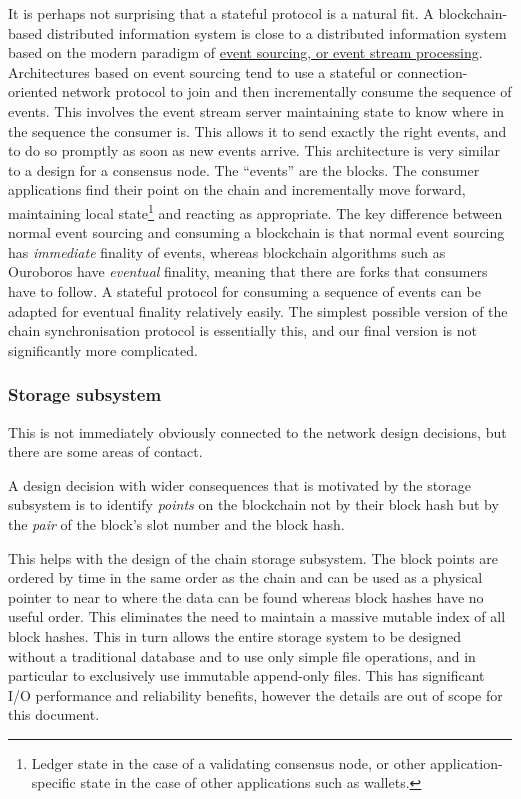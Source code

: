 \documentclass[11pt,a4paper]{article}
\begin{document}
It is perhaps not surprising that a stateful protocol is a natural fit.
A blockchain-based distributed information system is close to a
distributed information system based on the modern paradigm of
\href{https://en.wikipedia.org/wiki/Event-driven_architecture}{{event
sourcing, or event stream processing}}. Architectures based on event
sourcing tend to use a stateful or connection-oriented network protocol
to join and then incrementally consume the sequence of events. This
involves the event stream server maintaining state to know where in the
sequence the consumer is. This allows it to send exactly the right
events, and to do so promptly as soon as new events arrive. This
architecture is very similar to a design for a consensus node. The
``events'' are the blocks. The consumer applications find their point on
the chain and incrementally move forward, maintaining local
state\footnote{Ledger state in the case of a validating consensus node,
  or other application-specific state in the case of other applications
  such as wallets.} and reacting as appropriate. The key difference
between normal event sourcing and consuming a blockchain is that normal
event sourcing has \emph{immediate} finality of events, whereas
blockchain algorithms such as Ouroboros have \emph{eventual} finality,
meaning that there are forks that consumers have to follow. A stateful
protocol for consuming a sequence of events can be adapted for eventual
finality relatively easily. The simplest possible version of the chain
synchronisation protocol is essentially this, and our final version is
not significantly more complicated.

\subsubsection{Storage subsystem}
\label{storage-subsystem}

This is not immediately obviously connected to the network design
decisions, but there are some areas of contact.

A design decision with wider consequences that is motivated by the
storage subsystem is to identify \emph{points} on the blockchain not by
their block hash but by the \emph{pair} of the block's slot number and
the block hash.

This helps with the design of the chain storage subsystem. The block
points are ordered by time in the same order as the chain and can be
used as a physical pointer to near to where the data can be found
whereas block hashes have no useful order. This eliminates the need to
maintain a massive mutable index of all block hashes. This in turn
allows the entire storage system to be designed without a traditional
database and to use only simple file operations, and in particular to
exclusively use immutable append-only files. This has significant I/O
performance and reliability benefits, however the details are out of
scope for this document.
\end{document}
